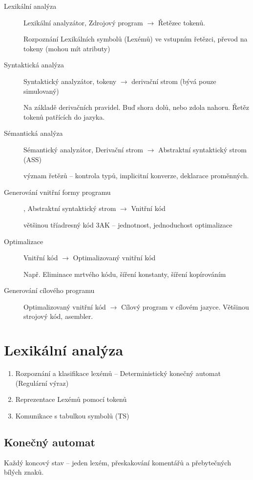 \documentclass[a4paper, 11pt]{report}
\begin{document}
\begin{description}
	\item[Lexikální analýza] Lexikální analyzátor, Zdrojový program $\to$ Řetězec tokenů. 
	
	Rozpoznání Lexikálních symbolů (Lexémů) ve vstupním řetězci, převod na tokeny (mohou mít atributy)
	\item[Syntaktická analýza] Syntaktický analyzátor, tokeny $\to$ derivační strom (bývá pouze simulovaný)
	
	Na základě derivačních pravidel. Buď shora dolů, nebo zdola nahoru. Řetěz tokenů patřících do jazyka.
	\item[Sémantická analýza] Sémantický analyzátor, Derivační strom $\to$ Abstraktní syntaktický strom (ASS)
	
	význam řetězů -- kontrola typů, implicitní konverze, deklarace proměnných.
	\item[Generování vnitřní formy programu], Abstraktní syntaktický strom $\to$ Vnitřní kód
	
	většinou tříadresný kód 3AK -- jednotnost, jednoduchost optimalizace
	\item[Optimalizace] Vnitřní kód $\to$ Optimalizovaný vnitřní kód
	
	Např. Eliminace mrtvého kódu, šíření konstanty, šíření kopírováním
	\item[Generování cílového programu] Optimalizovaný vnitřní kód $\to$ Cílový program v cílovém jazyce. Většinou strojový kód, asembler.
\end{description}

\section{Lexikální analýza}

\begin{enumerate}
	\item Rozpoznání a klasifikace lexémů -- Deterministický konečný automat (Regulární výraz)
	\item Reprezentace Lexémů pomocí tokenů
	\item Komunikace s tabulkou symbolů (TS)
\end{enumerate}

\subsection{Konečný automat}
Každý koncový stav -- jeden lexém, přeskakování komentářů a přebytečných bílých znaků.
\end{document}
